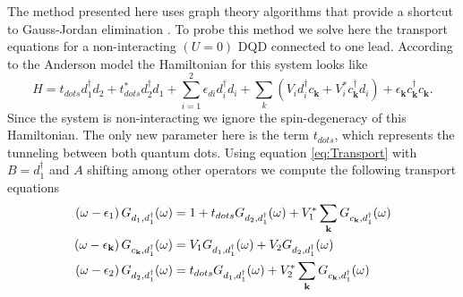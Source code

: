 The method presented here uses graph theory algorithms that provide a shortcut to Gauss-Jordan elimination \cite{spielman10}. To probe this method we solve here the transport equations for a non-interacting $(U=0)$ DQD connected to one lead. According to the Anderson model the Hamiltonian for this system looks like 
\begin{equation}
    H=t_{dots}d_{1}^{\dagger}d_{2}+t_{dots}^*d_{2}^{\dagger}d_{1}+ \sum_{i=1}^2\epsilon_{di}d_{i}^{\dagger}d_{i}+\sum_{k}\left(V_{i}d_{i}^{\dagger}c_{\mathbf{k}}+V_{i}^{*}c_{\mathbf{k}}^{\dagger}d_{i}\right) + \epsilon_{\mathbf{k}}c_{\mathbf{k}}^{\dagger}c_{\mathbf{k}}.
    \label{HDQD}
\end{equation} 
Since the system is non-interacting we ignore the spin-degeneracy of this Hamiltonian. The only new parameter here is the term $t_{dots}$, which represents the tunneling between both quantum dots.  Using equation \eqref{eq:Transport} with $B = d_1^\dagger$ and $A$ shifting among other operators we compute the following  transport equations
\begin{align}
     \left(\omega-\epsilon_{1}\right)G_{d_{1},d_{1}^{\dagger}}(\omega)&=1+t_{dots}G_{d_{2},d_{1}^{\dagger}}(\omega)+V_{1}^{*}\sum_{\mathbf{k}}G_{c_{\mathbf{k}},d_{1}^{\dagger}}(\omega) \label{eq:green1}  \\
     \left(\omega-\epsilon_{\mathbf{k}}\right)G_{c_{\mathbf{k}},d_{1}^{\dagger}}(\omega) &= V_{1}G_{d_{1},d_{1}^{\dagger}}(\omega)+V_{2}G_{d_{2},d_{1}^{\dagger}}(\omega) \label{eq:green2} \\
     \left(\omega-\epsilon_{2}\right)G_{d_{2},d_{1}^{\dagger}}(\omega)&= t_{dots}G_{d_{1},d_{1}^{\dagger}}(\omega)+V_{2}^{*}\sum_{\mathbf{k}}G_{c_{\mathbf{k}},d_{1}^{\dagger}}(\omega) \label{eq:green3} 
\end{align}



